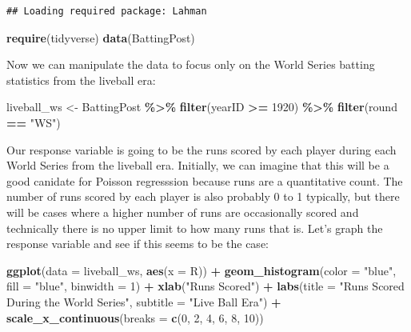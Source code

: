 \documentclass[
]{book}
\newenvironment{Shaded}{\begin{snugshade}}{\end{snugshade}}
\newcommand{\DataTypeTok}[1]{\textcolor[rgb]{0.13,0.29,0.53}{#1}}
\newcommand{\DecValTok}[1]{\textcolor[rgb]{0.00,0.00,0.81}{#1}}
\newcommand{\KeywordTok}[1]{\textcolor[rgb]{0.13,0.29,0.53}{\textbf{#1}}}
\newcommand{\NormalTok}[1]{#1}
\newcommand{\OperatorTok}[1]{\textcolor[rgb]{0.81,0.36,0.00}{\textbf{#1}}}
\newcommand{\StringTok}[1]{\textcolor[rgb]{0.31,0.60,0.02}{#1}}
\begin{document}
\begin{verbatim}
## Loading required package: Lahman
\end{verbatim}

\begin{Shaded}
\begin{Highlighting}[]
\KeywordTok{require}\NormalTok{(tidyverse)}
\KeywordTok{data}\NormalTok{(BattingPost)}
\end{Highlighting}
\end{Shaded}

Now we can manipulate the data to focus only on the World Series batting statistics from the liveball era:

\begin{Shaded}
\begin{Highlighting}[]
\NormalTok{liveball\_ws \textless{}{-}}\StringTok{ }\NormalTok{BattingPost }\OperatorTok{\%\textgreater{}\%}
\StringTok{  }\KeywordTok{filter}\NormalTok{(yearID }\OperatorTok{\textgreater{}=}\StringTok{ }\DecValTok{1920}\NormalTok{) }\OperatorTok{\%\textgreater{}\%}
\StringTok{  }\KeywordTok{filter}\NormalTok{(round }\OperatorTok{==}\StringTok{ "WS"}\NormalTok{)}
\end{Highlighting}
\end{Shaded}

Our response variable is going to be the runs scored by each player during each World Series from the liveball era. Initially, we can imagine that this will be a good canidate for Poisson regresssion because runs are a quantitative count. The number of runs scored by each player is also probably 0 to 1 typically, but there will be cases where a higher number of runs are occasionally scored and technically there is no upper limit to how many runs that is. Let's graph the response variable and see if this seems to be the case:

\begin{Shaded}
\begin{Highlighting}[]
\KeywordTok{ggplot}\NormalTok{(}\DataTypeTok{data =}\NormalTok{ liveball\_ws, }\KeywordTok{aes}\NormalTok{(}\DataTypeTok{x =}\NormalTok{ R)) }\OperatorTok{+}
\StringTok{  }\KeywordTok{geom\_histogram}\NormalTok{(}\DataTypeTok{color =} \StringTok{"blue"}\NormalTok{, }\DataTypeTok{fill =} \StringTok{"blue"}\NormalTok{, }\DataTypeTok{binwidth =} \DecValTok{1}\NormalTok{) }\OperatorTok{+}
\StringTok{  }\KeywordTok{xlab}\NormalTok{(}\StringTok{"Runs Scored"}\NormalTok{) }\OperatorTok{+}
\StringTok{  }\KeywordTok{labs}\NormalTok{(}\DataTypeTok{title =} \StringTok{"Runs Scored During the World Series"}\NormalTok{, }
       \DataTypeTok{subtitle =} \StringTok{"Live Ball Era"}\NormalTok{) }\OperatorTok{+}
\StringTok{  }\KeywordTok{scale\_x\_continuous}\NormalTok{(}\DataTypeTok{breaks =} \KeywordTok{c}\NormalTok{(}\DecValTok{0}\NormalTok{, }\DecValTok{2}\NormalTok{, }\DecValTok{4}\NormalTok{, }\DecValTok{6}\NormalTok{, }\DecValTok{8}\NormalTok{, }\DecValTok{10}\NormalTok{)) }
\end{Highlighting}
\end{Shaded}
\end{document}
